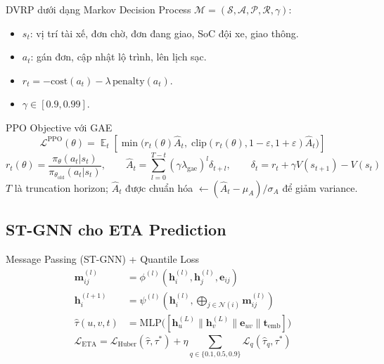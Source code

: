 \documentclass[12pt,a4paper]{article}
\DeclareMathOperator*{\E}{\mathbb{E}}
\begin{document}
\begin{definitionbox}{DVRP dưới dạng Markov Decision Process}
$\mathcal{M}=(\mathcal{S},\mathcal{A},\mathcal{P},\mathcal{R},\gamma)$:
\begin{itemize}
  \item $s_t$: vị trí tài xế, đơn chờ, đơn đang giao, SoC đội xe, giao thông.
  \item $a_t$: gán đơn, cập nhật lộ trình, lên lịch sạc.
  \item $r_t = -\mathrm{cost}(a_t) - \lambda\,\mathrm{penalty}(a_t)$.
  \item $\gamma\in[0.9,0.99]$.
\end{itemize}
\end{definitionbox}

\begin{formulabox}{PPO Objective với GAE}
\begin{equation}
  \mathcal{L}^{\mathrm{PPO}}(\theta)
  = \E_t\!\left[
      \min\!\bigl(r_t(\theta)\hat{A}_t,\;
        \mathrm{clip}(r_t(\theta),1{-}\varepsilon,1{+}\varepsilon)\hat{A}_t\bigr)
    \right]
\end{equation}
\begin{equation}
  r_t(\theta)=\frac{\pi_\theta(a_t|s_t)}{\pi_{\theta_\mathrm{old}}(a_t|s_t)},
  \qquad
  \hat{A}_t = \sum_{l=0}^{T-t}(\gamma\lambda_{\mathrm{gae}})^l\delta_{t+l},
  \qquad
  \delta_t = r_t+\gamma V(s_{t+1})-V(s_t)
\end{equation}
$T$ là truncation horizon; $\hat{A}_t$ được chuẩn hóa
$\leftarrow (\hat{A}_t - \mu_A)/\sigma_A$ để giảm variance.
\end{formulabox}

\subsection{ST-GNN cho ETA Prediction}

\begin{formulabox}{Message Passing (ST-GNN) + Quantile Loss}
\begin{align}
  \mathbf{m}_{ij}^{(l)} &= \phi^{(l)}(\mathbf{h}_i^{(l)},\mathbf{h}_j^{(l)},\mathbf{e}_{ij})\\
  \mathbf{h}_i^{(l+1)} &= \psi^{(l)}\!\left(\mathbf{h}_i^{(l)},\bigoplus_{j\in\mathcal{N}(i)}\mathbf{m}_{ij}^{(l)}\right)\\
  \hat{\tau}(u,v,t) &= \mathrm{MLP}\bigl([\mathbf{h}_u^{(L)}\|\mathbf{h}_v^{(L)}\|\mathbf{e}_{uv}\|\mathbf{t}_{\mathrm{emb}}]\bigr)
\end{align}
\begin{equation}
  \mathcal{L}_{\mathrm{ETA}}
  = \mathcal{L}_{\mathrm{Huber}}(\hat{\tau},\tau^*)
  + \eta\sum_{q\in\{0.1,0.5,0.9\}}\mathcal{L}_q(\hat{\tau}_q,\tau^*)
\end{equation}
\end{formulabox}
\end{document}
